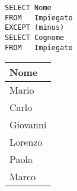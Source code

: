 \begin{lstlisting}
SELECT Nome
FROM   Impiegato
EXCEPT (minus)
SELECT Cognome
FROM   Impiegato
\end{lstlisting}

\begin{table}[H]
	\centering
	\begin{tabular}{@{} l @{}}
		\toprule
			Nome \\
		\midrule
			Mario \\
			Carlo \\
			Giovanni \\
			Lorenzo \\
			Paola \\
		 	Marco \\
		\bottomrule
	\end{tabular}
\end{table}
